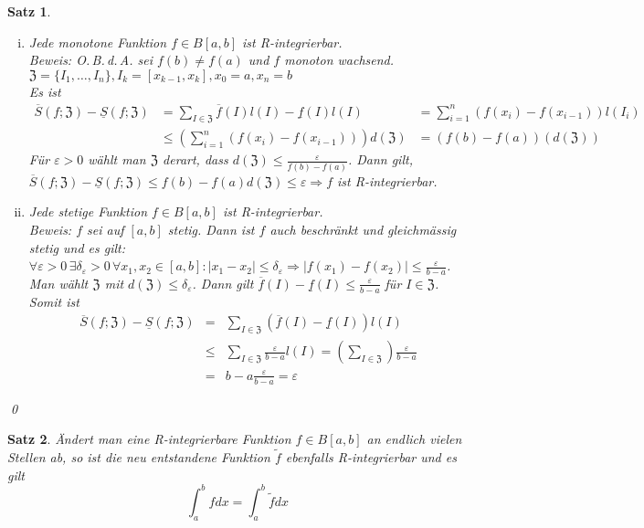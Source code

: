 \documentclass[ngerman,titlepage,twoside, parskip=half*]{scrreprt}
\newcommand*{\ZZ}{\mathfrak{Z}}
\theoremstyle{plain}
\newtheorem{theorem}{Satz}[section]
\theoremstyle{definition}
\theoremstyle{remark}
\begin{document}
\begin{theorem}
  \begin{enumerate}[(i)]
    \item Jede \emph{monotone} Funktion $f\in B[a,b]$ ist R-integrierbar.\\
      \textit{Beweis}: O.\,B.\,d.\,A. sei $f(b)\neq f(a)$ und $f$ monoton wachsend.
      $\ZZ=\{I_1,\dots,I_n\}, I_k=[x_{k-1},x_k], x_0=a,x_n=b$\\
      Es ist
      \begin{align*}
        \overline{S}(f;\ZZ)-\underline{S}(f;\ZZ)&= \sum_{I\in\ZZ} \overline{f}
        (I)l(I)-\underline{f}(I)l(I)
        &= \sum_{i=1}^n (f(x_i)-f(x_{i-1}))l(I_i)\\
        &\leq \left( \sum_{i=1}^n (f(x_i)-f(x_{i-1})) \right)d(\ZZ)
        &= (f(b)-f(a))(d(\ZZ))
      \end{align*}
      Für $\varepsilon>0$ wählt man $\ZZ$ derart, dass $d(\ZZ)\leq
      \frac{\varepsilon}{f(b)-f(a)}$. Dann gilt, $\overline{S}(f;\ZZ)-
      \underline{S}(f;\ZZ)\leq f(b)-f(a)d(\ZZ)\leq \varepsilon\Rightarrow f$
      ist R-integrierbar.
    \item Jede \emph{stetige} Funktion $f\in B[a,b]$ ist R-integrierbar.\\
      \textit{Beweis}: $f$ sei auf $[a,b]$ stetig. Dann ist $f$ auch beschränkt
      und gleichmässig stetig und es gilt:
      $\forall\varepsilon>0\,\exists\delta_\varepsilon>0\,\forall x_1,x_2\in
      [a,b]\colon |x_1-x_2|\leq\delta_\varepsilon\Rightarrow|f(x_1)-f(x_2)|\leq
      \frac{\varepsilon}{b-a}$. Man wählt $\ZZ$ mit $d(\ZZ)\leq
      \delta_\varepsilon$. Dann gilt $\overline{f}(I)-\underline{f}(I)\leq
      \frac{\varepsilon}{b-a}$ für $I \in\ZZ$. Somit ist
      \begin{align*}
        \overline{S}(f;\ZZ)-\underline{S}(f;\ZZ)&=& \sum_{I\in\ZZ}
        (\overline{f}(I)-\underline{f}(I))l(I)\\
        &\leq& \sum_{I\in\ZZ} \frac{\varepsilon}{b-a} l(I)=\left( \sum_{I\in\ZZ}
        \right)\frac{\varepsilon}{b-a}\\
        &=& b-a\frac{\varepsilon}{b-a}=\varepsilon
      \end{align*}
  \end{enumerate}
  \qed
\end{theorem}

\begin{theorem}
  Ändert man eine R-integrierbare Funktion $f\in B[a,b]$ an endlich vielen
  Stellen ab, so ist die neu entstandene Funktion $\tilde{f}$ ebenfalls
  R-integrierbar und es gilt
  \[\int_a^b fdx = \int_a^b \tilde{f}dx\]
\end{theorem}
\end{document}
